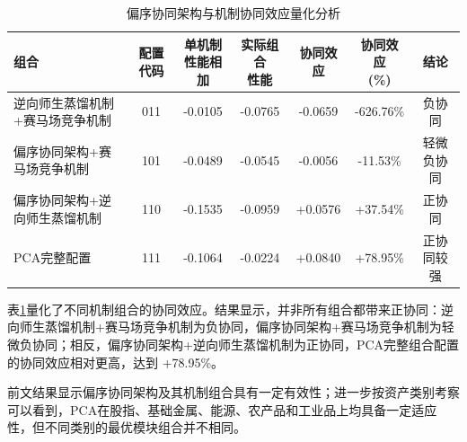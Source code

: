 \begin{table}[htbp]
\centering
\caption{偏序协同架构与机制协同效应量化分析}
\label{tab:synergyEffect}
\footnotesize
\setlength{\tabcolsep}{4pt}
\renewcommand{\arraystretch}{1.18}
\begin{tabular}{p{3.7cm}cccccc}
\toprule
\textbf{组合} & \textbf{配置代码} & \makecell{\textbf{单机制}\\\textbf{性能相加}} & \makecell{\textbf{实际组合}\\\textbf{性能}} & \textbf{协同效应} & \makecell{\textbf{协同效应}\\\textbf{(\%)}} & \textbf{结论} \\
\midrule
逆向师生蒸馏机制+赛马场竞争机制 & 011 & -0.0105 & -0.0765 & -0.0659 & -626.76\% & 负协同 \\
偏序协同架构+赛马场竞争机制 & 101 & -0.0489 & -0.0545 & -0.0056 & -11.53\% & 轻微负协同 \\
偏序协同架构+逆向师生蒸馏机制 & 110 & -0.1535 & -0.0959 & +0.0576 & +37.54\% & 正协同 \\
PCA完整配置 & 111 & -0.1064 & -0.0224 & +0.0840 & +78.95\% & 正协同较强 \\
\bottomrule
\end{tabular}
\end{table}

表\ref{tab:synergyEffect}量化了不同机制组合的协同效应。结果显示，并非所有组合都带来正协同：逆向师生蒸馏机制+赛马场竞争机制为负协同，偏序协同架构+赛马场竞争机制为轻微负协同；相反，偏序协同架构+逆向师生蒸馏机制为正协同，PCA完整组合配置的协同效应相对更高，达到 +78.95\%。

前文结果显示偏序协同架构及其机制组合具有一定有效性；进一步按资产类别考察可以看到，PCA在股指、基础金属、能源、农产品和工业品上均具备一定适应性，但不同类别的最优模块组合并不相同。

